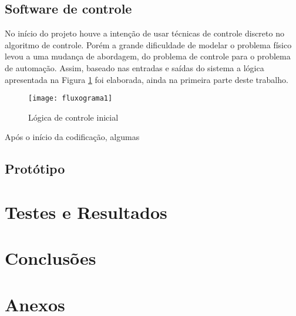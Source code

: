 \documentclass[a4paper,11pt]{article}
\begin{document}
%
\subsection{Software de controle}
\label{sec:software}
No início do projeto houve a intenção de usar técnicas de controle discreto no algoritmo de controle.
Porém a grande dificuldade de modelar o problema físico levou a uma mudança de abordagem, do problema de controle para o problema de automação. Assim, baseado nas entradas e saídas do sistema a lógica apresentada na Figura \ref{fig: fluxograma1} foi elaborada, ainda na primeira parte deste trabalho. 
\begin{figure}[ht]
 \begin{center}
  \texttt{[image: fluxograma1]}
 \end{center}
 \caption{Lógica de controle inicial}
 \label{fig: fluxograma1}
\end{figure}
Após o início da codificação, algumas 

 
%
\subsection{Protótipo}
\label{sec:prototipo}


\pagebreak
%
\section{Testes e Resultados}
\label{sec:resultados}

\pagebreak
%
\section{Conclusões}
\label{sec:conclusoes}


\pagebreak
%
\section{Anexos}
\label{sec:anexos}

%
\end{document}
